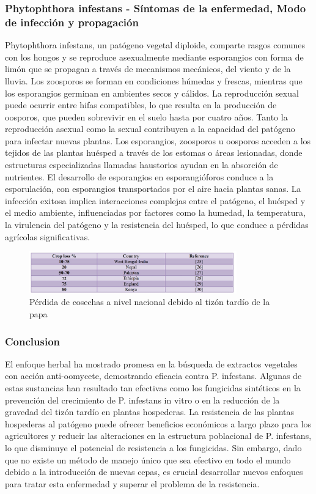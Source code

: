 \subsubsection{Phytophthora infestans - Síntomas de la enfermedad, Modo de infección y propagación}
Phytophthora infestans, un patógeno vegetal diploide, comparte rasgos comunes con los hongos y se reproduce asexualmente mediante esporangios con forma de limón que se propagan a través de mecanismos mecánicos, del viento y de la lluvia. Los zoosporos se forman en condiciones húmedas y frescas, mientras que los esporangios germinan en ambientes secos y cálidos. La reproducción sexual puede ocurrir entre hifas compatibles, lo que resulta en la producción de oosporos, que pueden sobrevivir en el suelo hasta por cuatro años. Tanto la reproducción asexual como la sexual contribuyen a la capacidad del patógeno para infectar nuevas plantas. Los esporangios, zoosporos u oosporos acceden a los tejidos de las plantas huésped a través de los estomas o áreas lesionadas, donde estructuras especializadas llamadas haustorios ayudan en la absorción de nutrientes. El desarrollo de esporangios en esporangióforos conduce a la esporulación, con esporangios transportados por el aire hacia plantas sanas. La infección exitosa implica interacciones complejas entre el patógeno, el huésped y el medio ambiente, influenciadas por factores como la humedad, la temperatura, la virulencia del patógeno y la resistencia del huésped, lo que conduce a pérdidas agrícolas significativas.

\begin{figure}[H]
	\begin{center}
		\includegraphics[width=0.8\textwidth]{2/figures/prom1.jpeg}
		\caption{Pérdida de cosechas a nivel nacional debido al tizón tardío de la papa}
		\label{}
	\end{center}
	
\end{figure}

\subsubsection{Conclusion}
El enfoque herbal ha mostrado promesa en la búsqueda de extractos vegetales con acción anti-oomycete, demostrando eficacia contra P. infestans. Algunas de estas sustancias han resultado tan efectivas como los fungicidas sintéticos en la prevención del crecimiento de P. infestans in vitro o en la reducción de la gravedad del tizón tardío en plantas hospederas. La resistencia de las plantas hospederas al patógeno puede ofrecer beneficios económicos a largo plazo para los agricultores y reducir las alteraciones en la estructura poblacional de P. infestans, lo que disminuye el potencial de resistencia a los fungicidas. Sin embargo, dado que no existe un método de manejo único que sea efectivo en todo el mundo debido a la introducción de nuevas cepas, es crucial desarrollar nuevos enfoques para tratar esta enfermedad y superar el problema de la resistencia.

